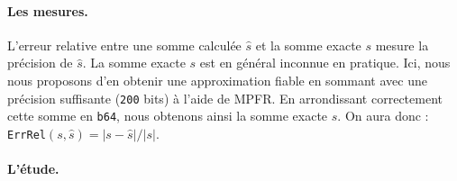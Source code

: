 \documentclass{exam}
\begin{document}
    \paragraph{\large Les mesures.}
    L'erreur relative entre une somme calculée $\hat{s}$ et la somme exacte $s$ mesure la précision de $\hat{s}$. La somme exacte $s$ est en général inconnue en pratique. Ici, nous nous proposons d'en obtenir une approximation fiable en sommant avec une précision suffisante (\verb=200= bits) à l'aide de MPFR. En arrondissant correctement cette somme en \verb=b64=, nous obtenons ainsi la somme exacte $s$. On aura donc : \verb=ErrRel=$(s,\hat{s})=|s-\hat{s}|/|s|$.

    \paragraph{\large L'étude.}
\end{document}
